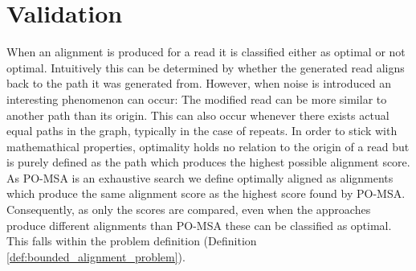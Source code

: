 \documentclass[thesis.tex]{subfiles}
\begin{document}
\section{Validation}
When an alignment is produced for a read it is classified either as optimal or not optimal. Intuitively this can be determined by whether the generated read aligns back to the path it was generated from. However, when noise is introduced an interesting phenomenon can occur: The modified read can be more similar to another path than its origin. This can also occur whenever there exists actual equal paths in the graph, typically in the case of repeats. In order to stick with mathemathical properties, optimality holds no relation to the origin of a read but is purely defined as the path which produces the highest possible alignment score. As PO-MSA is an exhaustive search we define optimally aligned as alignments which produce the same alignment score as the highest score found by PO-MSA. Consequently, as only the scores are compared, even when the approaches produce different alignments than PO-MSA these can be classified as optimal. This falls within the problem definition (Definition \ref{def:bounded_alignment_problem}).
\end{document}
